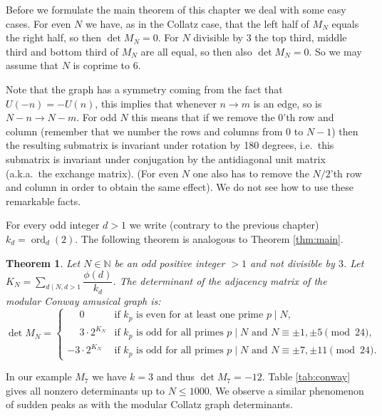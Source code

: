 \documentclass[10pt]{article}
\newtheorem{theorem}{Theorem}
\theoremstyle{definition}
\newcommand{\N}{\mathbb{N}}
\DeclareMathOperator{\ord}{ord}
\begin{document}
Before we formulate the main theorem of this chapter we deal with some easy cases. For even $ N $ we
have, as in the Collatz case, that the left half of $ M_N $ equals the right half, so then
$ \det M_N = 0 $. For $ N $ divisible by $ 3 $ the top third, middle third and bottom third of $ M_N $
are all equal, so then also $ \det M_N = 0 $. So we may assume that $ N $ is coprime to $ 6 $.

Note that the graph has a symmetry coming from the fact that $ U(-n) = - U(n) $, this implies that
whenever $ n \to m $ is an edge, so is $ N - n \to N - m $. For odd $ N $ this means that if we
remove the $ 0 $'th row and column (remember that we number the rows and columns from $ 0 $ to $ N - 1 $)
then the resulting submatrix is invariant under rotation by 180 degrees, i.e.\ this submatrix is
invariant under conjugation by the antidiagonal unit matrix (a.k.a.\ the exchange matrix). (For even
$ N $ one also has to remove the $ N/2 $'th row and column in order to obtain the same effect). We do not
see how to use these remarkable facts.

For every odd integer $ d > 1 $ we write (contrary to the previous chapter) $ k_d = \ord_d(2) $.
The following theorem is analogous to Theorem \ref{thm:main}.

\begin{theorem} \label{thm:mainConway}
    Let $ N \in \N $ be an odd positive integer $ > 1 $ and not divisible by $ 3 $. Let
    $ K_N = \displaystyle \sum_{d \mid N, d > 1} \dfrac{\phi(d)}{k_d} $. The determinant of the
    adjacency matrix of the modular Conway amusical graph is:
    \begin{equation}
        \det M_N = \begin{cases}
            \phantom{- }0               & \text{if } k_p \text{ is even for at least one prime } p \mid N, \\
            \phantom{- }3 \cdot 2^{K_N} & \text{if } k_p \text{ is odd for all primes } p \mid N \text{ and }
            N \equiv \pm 1, \pm 5 \pmod{24}, \\
            - 3 \cdot 2^{K_N} & \text{if } k_p \text{ is odd for all primes } p \mid N \text{ and }
            N \equiv \pm 7, \pm 11 \pmod{24}.
        \end{cases}
    \end{equation}
\end{theorem}

In our example $ M_7 $ we have $ k = 3 $ and thus $ \det M_7 = -12 $. Table \ref{tab:conway} gives all
nonzero determinants up to $ N \leq 1000 $. We observe a similar phenomenon of sudden peaks as with the
modular Collatz graph determinants.
\end{document}
